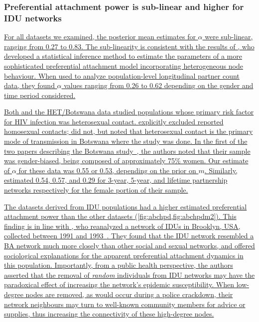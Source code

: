 \documentclass[12pt]{article}\usepackage[]{graphicx}\usepackage[]{color}
\let\mref\cref
\let\mciteauthor\citeauthor
\renewcommand{\cref}[1]{\mbox{\mref{#1}}}
\renewcommand{\citeauthor}[1]{\mbox{\mciteauthor{#1}}}
\newcommand{\add}[1]{\color{blue} \uline{#1} \color{black}}
\begin{document}
\subsubsection*{Preferential attachment power is sub-linear and higher for IDU networks}

\add{For all datasets we examined, the posterior mean estimates for $\alpha$
were sub-linear, ranging from 
    0.27
to 
    0.83.
The sub-linearity is consistent with the results of
\textcite{de2007preferential}, who developed a statistical inference method to
estimate the parameters of a more sophisticated preferential attachment model
incorporating heterogeneous node behaviour. When used to analyze
population-level longitudinal partner count data, they found $\alpha$ values
ranging from 0.26 to 0.62 depending on the gender and time period considered.}

\add{Both \textcite{de2007preferential} and the HET/Botswana data studied
populations whose primary risk factor for HIV infection was heterosexual
contact. \citeauthor{de2007preferential} explicitly excluded reported
homosexual contacts; \citeauthor{novitsky2014impact} did not, but noted that
heterosexual contact is the primary mode of transmission in Botswana where the
study was done. In the first of the two papers describing the Botswana
study~\autocite{novitsky2013phylogenetic}, the authors noted that their sample
was gender-biased, being composed of approximately 75\% women. Our estimate of
$\alpha$ for these data was 
    0.55
        or 
    0.53,
depending on the prior on $m$. Similarly, \textcite{de2007preferential}
estimated 0.54, 0.57, and 0.29 for 3-year, 5-year, and lifetime partnership
networks respectively for the female portion of their sample.}

\add{The datasets derived from IDU populations had a higher estimated
preferential attachment power than the other datasets
(\cref{fig:abchpd,fig:abchpdm2}). This finding is in line with
\textcite{dombrowski2013topological}, who reanalyzed a network of IDUs in
Brooklyn, USA, collected between 1991 and 1993~\autocite{friedman2006social}.
They found that the IDU network resembled a BA network much more closely than
other social and sexual networks, and offered sociological explanations for the
apparent preferential attachment dynamics in this population. Importantly, from
a public health perspective, the authors asserted that the removal of
\emph{random} individuals from IDU networks may have the paradoxical effect of
increasing the network's epidemic susceptibility. When low-degree nodes are
removed, as would occur during a police crackdown, their network neighbours may
turn to well-known community members for advice or supplies, thus increasing
the connectivity of these high-degree nodes.}
\end{document}
